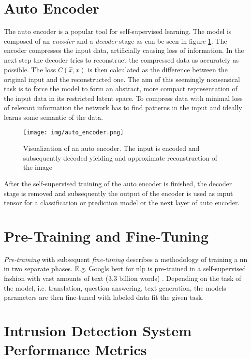 \section{Auto Encoder} \label{sec:backgrund:autoencoder}

The auto encoder is a popular tool for self-supervised learning. The model is composed of an \textit{encoder} and a \textit{decoder} stage as can be seen in figure \ref{fig:auto_encoder}. The encoder compresses the input data, artificially causing loss of information. In the next step the decoder tries to reconstruct the compressed data as accurately as possible. The loss $C(\hat{x},x)$ is then calculated as the difference between the original input and the reconstructed one. The aim of this seemingly nonsensical task is to force the model to form an abstract, more compact representation of 
the input data in its restricted latent space. To compress data with minimal loss of relevant information the network has to find patterns in the input and ideally learns some semantic of the data. 

\begin{figure}[h]
	\centering
	\texttt{[image: img/auto\_encoder.png]}
	\caption{Visualization of an auto encoder. The input is encoded and subsequently decoded yielding and approximate reconstruction of the image \cite{auto_encoders}}
	\label{fig:auto_encoder}
\end{figure}

After the self-supervised training of the auto encoder is finished, the decoder stage is removed and subsequently the output of the encoder is used as input tensor for a classification or prediction model or the next layer of auto encoder. 

\section{Pre-Training and Fine-Tuning}

\textit{Pre-training} with subsequent \textit{fine-tuning} describes a methodology of training a \gls{nn} in two separate phases. E.g. Googls \gls{bert} for \gls{nlp} is pre-trained in a self-supervised fashion with vast amounts of text (3.3 billion words) \cite{bert}. Depending on the task of the model, i.e. translation, question answering, text generation, the models parameters are then fine-tuned with labeled data fit the given task.

\section{Intrusion Detection System Performance Metrics} \label{sec:background:metrics}

